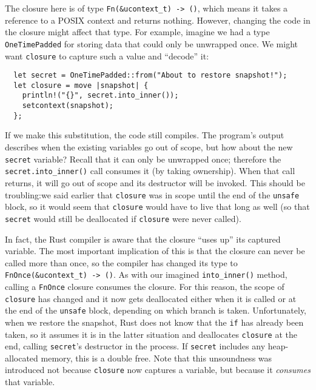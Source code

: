 The closure here is of type \texttt{Fn(\&ucontext\_t) -> ()}, which means it takes a
reference to a POSIX context and returns nothing.  However, changing the code in the
closure might affect that type.  For example, imagine we had a type
\texttt{OneTimePadded} for storing data that could only be unwrapped once.  We might
want \texttt{closure} to capture such a value and ``decode'' it:
\begin{lstlisting}
  let secret = OneTimePadded::from("About to restore snapshot!");
  let closure = move |snapshot| {
  	println!("{}", secret.into_inner());
	setcontext(snapshot);
  };
\end{lstlisting}

If we make this substitution, the code still compiles.  The program's output
describes when the existing variables go out of scope, but how about the new
\texttt{secret} variable?  Recall that it can only be unwrapped once; therefore the
\texttt{secret.into\_inner()} call consumes it (by taking ownership).  When that call
returns, it will go out of scope and its destructor will be invoked.  This should be
troubling:\@ we said earlier that \texttt{closure} was in scope until the end of the
\texttt{unsafe} block, so it would seem that \texttt{closure} would have to live that
long as well (so that \texttt{secret} would still be deallocated if \texttt{closure}
were never called).

In fact, the Rust compiler is aware that the closure ``uses up'' its captured
variable.  The most important implication of this is that the closure can never be
called more than once, so the compiler has changed its type to
\texttt{FnOnce(\&ucontext\_t) -> ()}.  As with our imagined \texttt{into\_inner()}
method, calling a \texttt{FnOnce} closure consumes the closure.  For this reason, the
scope of \texttt{closure} has changed and it now gets deallocated either when it is
called or at the end of the \texttt{unsafe} block, depending on which branch is
taken.  Unfortunately, when we restore the snapshot, Rust does not know that the
\texttt{if} has already been taken, so it assumes it is in the latter situation and
deallocates \texttt{closure} at the end, calling \texttt{secret}'s destructor in the
process.  If \texttt{secret} includes any heap-allocated memory, this is a double
free.  Note that this unsoundness was introduced not because \texttt{closure} now
captures a variable, but because it \textit{consumes} that variable.


